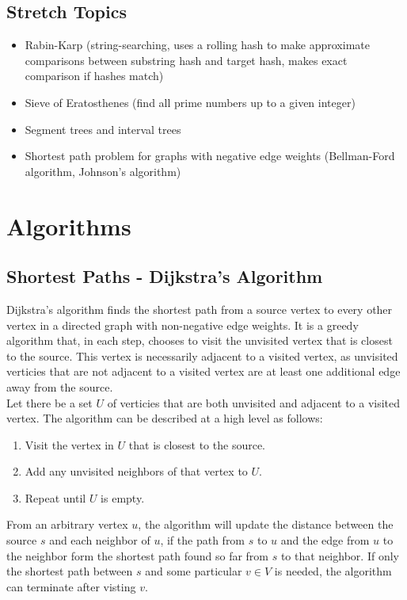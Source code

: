 \documentclass[12pt, titlepage]{article}
\begin{document}
\subsection{Stretch Topics}
\begin{itemize}
  \item Rabin-Karp (string-searching, uses a rolling hash to make approximate comparisons between substring hash and target hash, makes exact comparison if hashes match)
  \item Sieve of Eratosthenes (find all prime numbers up to a given integer)
  \item Segment trees and interval trees
  \item Shortest path problem for graphs with negative edge weights (Bellman-Ford algorithm, Johnson's algorithm)
\end{itemize}

\newpage
\appendix

\section{Algorithms}

\subsection{Shortest Paths - Dijkstra's Algorithm} \label{dijkstra}

Dijkstra's algorithm finds the shortest path from a source vertex to every other vertex in a directed graph with non-negative edge weights. It is a greedy algorithm that, in each step, chooses to visit the unvisited vertex that is closest to the source. This vertex is necessarily adjacent to a visited vertex, as unvisited verticies that are not adjacent to a visited vertex are at least one additional edge away from the source. \\

Let there be a set $U$ of verticies that are both unvisited and adjacent to a visited vertex. The algorithm can be described at a high level as follows:

\begin{enumerate}
  \item Visit the vertex in $U$ that is closest to the source.
  \item Add any unvisited neighbors of that vertex to $U$.
  \item Repeat until $U$ is empty.
\end{enumerate}

From an arbitrary vertex $u$, the algorithm will update the distance between the source $s$ and each neighbor of $u$, if the path from $s$ to $u$ and the edge from $u$ to the neighbor form the shortest path found so far from $s$ to that neighbor. If only the shortest path between $s$ and some particular $v \in V$ is needed, the algorithm can terminate after visting $v$. \\
\end{document}
